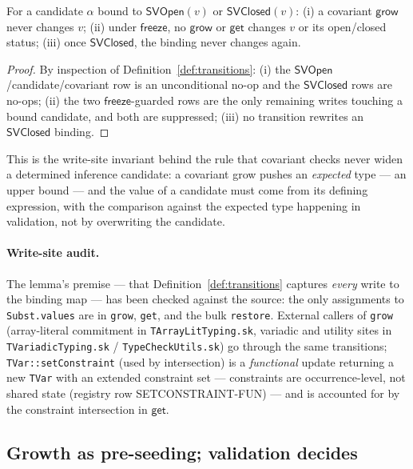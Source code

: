 \documentclass[11pt]{article}
\newcommand{\SVOpen}{\mathsf{SVOpen}}
\newcommand{\SVClosed}{\mathsf{SVClosed}}
\begin{document}
\begin{lemma}
\label{lem:never-widen}
For a candidate $\alpha$ bound to $\SVOpen(v)$ or $\SVClosed(v)$:
(i) a covariant $\mathsf{grow}$ never changes $v$;
(ii) under $\mathsf{freeze}$, no $\mathsf{grow}$ or $\mathsf{get}$ changes
$v$ or its open/closed status;
(iii) once $\SVClosed$, the binding never changes again.
\end{lemma}
\begin{proof}
By inspection of Definition~\ref{def:transitions}: (i) the
$\SVOpen$/candidate/covariant row is an unconditional no-op and the
$\SVClosed$ rows are no-ops; (ii) the two $\mathsf{freeze}$-guarded rows are
the only remaining writes touching a bound candidate, and both are
suppressed; (iii) no transition rewrites an $\SVClosed$ binding.
\end{proof}

This is the write-site invariant behind the rule that covariant checks never
widen a determined inference candidate: a covariant grow pushes an
\emph{expected} type — an upper
bound — and the value of a candidate must come from its defining expression,
with the comparison against the expected type happening in validation, not by
overwriting the candidate.

\paragraph{Write-site audit.}
The lemma's premise — that Definition~\ref{def:transitions} captures
\emph{every} write to the binding map — has been checked against the source:
the only assignments to \texttt{Subst.values} are in \texttt{grow},
\texttt{get}, and the bulk \texttt{restore}. External callers of
\texttt{grow} (array-literal commitment in \texttt{TArrayLitTyping.sk},
variadic and utility sites in \texttt{TVariadicTyping.sk} /
\texttt{TypeCheckUtils.sk}) go through the same transitions;
\texttt{TVar::setConstraint} (used by intersection) is a \emph{functional}
update returning a new \texttt{TVar} with an extended constraint set —
constraints are occurrence-level, not shared state (registry row
SETCONSTRAINT-FUN) — and is
accounted for by the constraint intersection in $\mathsf{get}$.

\subsection{Growth as pre-seeding; validation decides}
\end{document}
